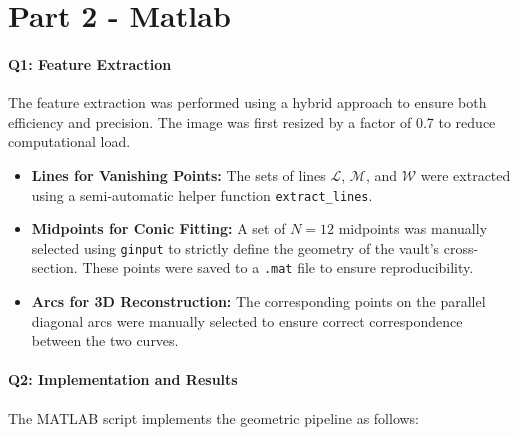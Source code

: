 \documentclass[a4paper,11pt]{article}
\begin{document}
\section*{Part 2 - Matlab}

\paragraph{Q1: Feature Extraction}
The feature extraction was performed using a hybrid approach to ensure both efficiency and precision.
The image was first resized by a factor of 0.7 to reduce computational load.
\begin{itemize}
    \item \textbf{Lines for Vanishing Points:} The sets of lines $\mathcal{L}$, $\mathcal{M}$, and $\mathcal{W}$ were extracted using a semi-automatic helper function \texttt{extract\_lines}.
    \item \textbf{Midpoints for Conic Fitting:} A set of $N=12$ midpoints was manually selected using \texttt{ginput} to strictly define the geometry of the vault's cross-section. These points were saved to a \texttt{.mat} file to ensure reproducibility.
    \item \textbf{Arcs for 3D Reconstruction:} The corresponding points on the parallel diagonal arcs were manually selected to ensure correct correspondence between the two curves.
\end{itemize}

\paragraph{Q2: Implementation and Results}
The MATLAB script implements the geometric pipeline as follows:
\end{document}
